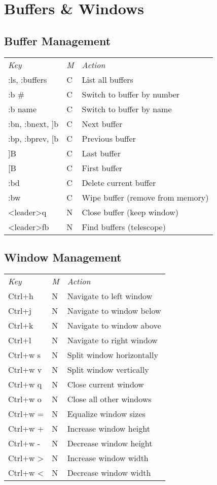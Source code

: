 \section{Buffers \& Windows}

\subsection{Buffer Management}
	\begin{tabularx}{\tablewidth}{llX}
		\emph{Key} & \emph{M} & \emph{Action} \\
		:ls, :buffers & C & List all buffers \\
		:b \# & C & Switch to buffer by number \\
		:b name & C & Switch to buffer by name \\
		:bn, :bnext, ]b & C & Next buffer \\
		:bp, :bprev, [b & C & Previous buffer \\
		]B & C & Last buffer \\
		[B & C & First buffer \\
		:bd & C & Delete current buffer \\
		:bw & C & Wipe buffer (remove from memory) \\
		<leader>q & N & Close buffer (keep window) \\
		<leader>fb & N & Find buffers (telescope) \\
	\end{tabularx}

\subsection{Window Management}
	\begin{tabularx}{\tablewidth}{llX}
		\emph{Key} & \emph{M} & \emph{Action} \\
		Ctrl+h & N & Navigate to left window \\
		Ctrl+j & N & Navigate to window below \\
		Ctrl+k & N & Navigate to window above \\
		Ctrl+l & N & Navigate to right window \\
		Ctrl+w s & N & Split window horizontally \\
		Ctrl+w v & N & Split window vertically \\
		Ctrl+w q & N & Close current window \\
		Ctrl+w o & N & Close all other windows \\
		Ctrl+w = & N & Equalize window sizes \\
		Ctrl+w + & N & Increase window height \\
		Ctrl+w - & N & Decrease window height \\
		Ctrl+w > & N & Increase window width \\
		Ctrl+w < & N & Decrease window width \\
	\end{tabularx}

